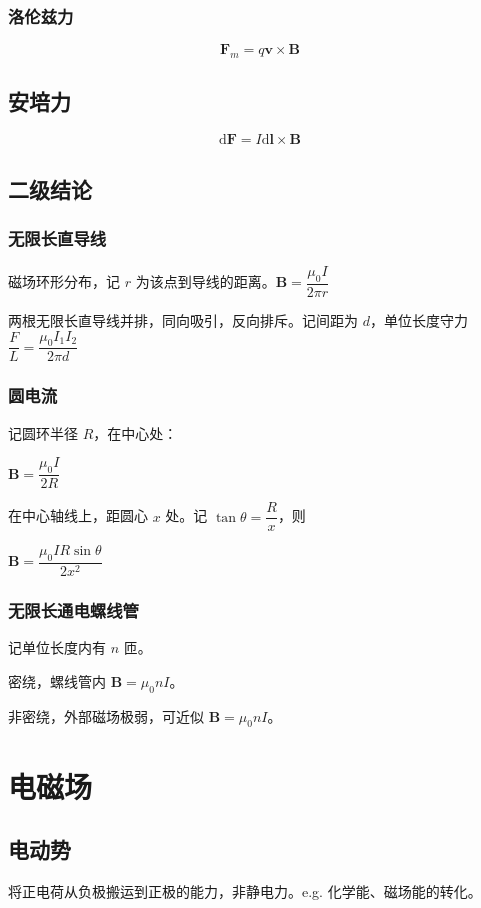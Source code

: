 \documentclass[12pt, a4paper, UTF8, openany]{ctexbook}
\newcommand{\dif}{\mathrm{d}}
\newcommand{\vect}[1]{\mathbf{#1}}
\newcommand{\vecv}{\vect{v}}
\newcommand{\vecf}{\vect{F}}
\newcommand{\vecl}{\vect{l}}
\newcommand{\vecb}{\vect{B}}
\begin{document}
        \subsubsection{洛伦兹力}
        $$\vecf_{m} = q \vecv \times \vecb$$

        \subsection{安培力}
        $$\dif \vecf = I \dif \vecl \times \vecb$$

        \subsection{二级结论}
        \subsubsection{无限长直导线}
        磁场环形分布，记 $r$ 为该点到导线的距离。$\vecb = \dfrac{\mu_0 I}{2 \pi r}$

        两根无限长直导线并排，同向吸引，反向排斥。记间距为 $d$，单位长度守力 $\dfrac{F}{L} = \dfrac{\mu_0 I_1 I_2}{2 \pi d}$

        \subsubsection{圆电流}
        记圆环半径 $R$，在中心处：

        $\vecb = \dfrac{\mu_0 I}{2 R}$

        在中心轴线上，距圆心 $x$ 处。记 $\tan\theta = \dfrac{R}{x}$，则
        
        $\vecb = \dfrac{\mu_0 I R \sin\theta}{2 x^2}$

        \subsubsection{无限长通电螺线管}
        记单位长度内有 $n$ 匝。

        密绕，螺线管内 $\vecb = \mu_0 n I$。

        非密绕，外部磁场极弱，可近似 $\vecb = \mu_0 n I$。

    \section{电磁场}
        \subsection{电动势}
        将正电荷从负极搬运到正极的能力，非静电力。e.g. 化学能、磁场能的转化。
\end{document}
